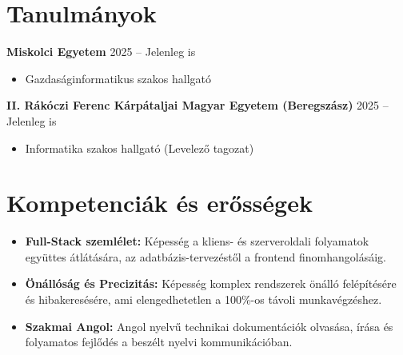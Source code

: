 \documentclass[10pt,a4paper]{article}
\begin{document}
\section{Tanulmányok}
\textbf{Miskolci Egyetem} \hfill 2025 -- Jelenleg is
\begin{itemize}
    \item Gazdaságinformatikus szakos hallgató
\end{itemize}
\vspace{4pt}
\textbf{II. Rákóczi Ferenc Kárpátaljai Magyar Egyetem (Beregszász)} \hfill 2025 -- Jelenleg is
\begin{itemize}
    \item Informatika szakos hallgató (Levelező tagozat)
\end{itemize}

\section{Kompetenciák és erősségek}
\begin{itemize}
    \item \textbf{Full-Stack szemlélet:} Képesség a kliens- és szerveroldali folyamatok együttes átlátására, az adatbázis-tervezéstől a frontend finomhangolásáig.
    \item \textbf{Önállóság és Precizitás:} Képesség komplex rendszerek önálló felépítésére és hibakeresésére, ami elengedhetetlen a 100\%-os távoli munkavégzéshez.
    \item \textbf{Szakmai Angol:} Angol nyelvű technikai dokumentációk olvasása, írása és folyamatos fejlődés a beszélt nyelvi kommunikációban.
\end{itemize}
\end{document}

